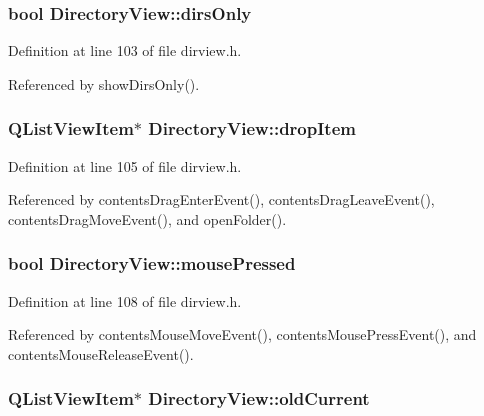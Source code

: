 \subsubsection{\setlength{\rightskip}{0pt plus 5cm}bool {\bf Directory\-View::dirs\-Only}\hspace{0.3cm}{\tt  [private]}}\label{classDirectoryView_DirectoryViewr0}




Definition at line 103 of file dirview.h.

Referenced by show\-Dirs\-Only().
\subsubsection{\setlength{\rightskip}{0pt plus 5cm}QList\-View\-Item$\ast$ {\bf Directory\-View::drop\-Item}\hspace{0.3cm}{\tt  [private]}}\label{classDirectoryView_DirectoryViewr2}




Definition at line 105 of file dirview.h.

Referenced by contents\-Drag\-Enter\-Event(), contents\-Drag\-Leave\-Event(), contents\-Drag\-Move\-Event(), and open\-Folder().
\subsubsection{\setlength{\rightskip}{0pt plus 5cm}bool {\bf Directory\-View::mouse\-Pressed}\hspace{0.3cm}{\tt  [private]}}\label{classDirectoryView_DirectoryViewr5}




Definition at line 108 of file dirview.h.

Referenced by contents\-Mouse\-Move\-Event(), contents\-Mouse\-Press\-Event(), and contents\-Mouse\-Release\-Event().
\subsubsection{\setlength{\rightskip}{0pt plus 5cm}QList\-View\-Item$\ast$ {\bf Directory\-View::old\-Current}\hspace{0.3cm}{\tt  [private]}}\label{classDirectoryView_DirectoryViewr1}




